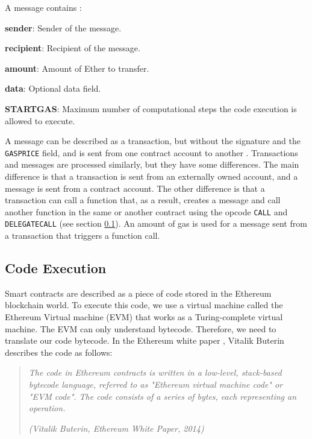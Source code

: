 A message contains :


\begin{list}{-}{}
   \item \textbf{sender}: Sender of the message.
   \item \textbf{recipient}: Recipient of the message.
   \item \textbf{amount}: Amount of Ether to transfer.
   \item \textbf{data}: Optional data field.
   \item \textbf{STARTGAS}: Maximum number of computational steps the code execution is allowed to execute.
\end{list}


A message can be described as a transaction, but without the signature and the \texttt{GASPRICE} field, and is sent from one contract account to another
. Transactions and messages are processed similarly, but they have some differences. The main difference
is that a transaction is sent from an externally owned account, and a message is sent from a contract account. The other difference is that a transaction
can call a function that, as a result, creates a message and call another function in the same or another contract using the opcode \texttt{CALL} and \texttt{DELEGATECALL}
(see section \ref{sec:evm}). An amount of gas is used for a message sent from a transaction that triggers a function call.


\subsection{Code Execution}
\label{sec:evm}

Smart contracts are described as a piece of code stored in the Ethereum blockchain world. To execute this code, we use a virtual machine called the Ethereum Virtual 
machine (EVM) that works as a Turing-complete virtual machine. The EVM can only understand bytecode. Therefore, we need to translate our code bytecode.
In the Ethereum white paper \cite{ethereum_white_paper}, Vitalik Buterin describes the code as follows:

\begin{quote}
   \textit{The code in Ethereum contracts is written in a low-level, stack-based bytecode language, referred to as "Ethereum virtual machine code" or "EVM code". The code consists of a series of bytes, each representing an operation.}

   \textit{(Vitalik Buterin, Ethereum White Paper, 2014)}
\end{quote}


